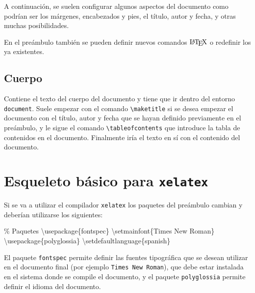 \documentclass[
  a4paper,
]{scrreport}
\newenvironment{Shaded}{\begin{snugshade}}{\end{snugshade}}
\newcommand{\BuiltInTok}[1]{\textcolor[rgb]{0.00,0.23,0.31}{#1}}
\newcommand{\CommentTok}[1]{\textcolor[rgb]{0.37,0.37,0.37}{#1}}
\newcommand{\ExtensionTok}[1]{\textcolor[rgb]{0.00,0.23,0.31}{#1}}
\newcommand{\FunctionTok}[1]{\textcolor[rgb]{0.28,0.35,0.67}{#1}}
\newcommand{\NormalTok}[1]{\textcolor[rgb]{0.00,0.23,0.31}{#1}}
\begin{document}
A continuación, se suelen configurar algunos aspectos del documento como
podrían ser los márgenes, encabezados y pies, el título, autor y fecha,
y otras muchas posibilidades.

En el preámbulo también se pueden definir nuevos comandos
\(\text{\LaTeX}\) o redefinir los ya existentes.

\hypertarget{cuerpo}{%
\subsection{Cuerpo}\label{cuerpo}}

Contiene el texto del cuerpo del documento y tiene que ir dentro del
entorno \texttt{document}. Suele empezar con el comando
\texttt{\textbackslash{}maketitle} si se desea empezar el documento con
el título, autor y fecha que se hayan definido previamente en el
preámbulo, y le sigue el comando
\texttt{\textbackslash{}tableofcontents} que introduce la tabla de
contenidos en el documento. Finalmente iría el texto en sí con el
contenido del documento.

\hypertarget{esqueleto-buxe1sico-para-xelatex}{%
\section{\texorpdfstring{Esqueleto básico para
\texttt{xelatex}}{Esqueleto básico para xelatex}}\label{esqueleto-buxe1sico-para-xelatex}}

Si se va a utilizar el compilador \texttt{xelatex} los paquetes del
preámbulo cambian y deberían utilizarse los siguientes:

\begin{Shaded}
\begin{Highlighting}[]
\CommentTok{\% Paquetes}
\BuiltInTok{\textbackslash{}usepackage}\NormalTok{\{}\ExtensionTok{fontspec}\NormalTok{\}}
\FunctionTok{\textbackslash{}setmainfont}\NormalTok{\{Times New Roman\}}
\BuiltInTok{\textbackslash{}usepackage}\NormalTok{\{}\ExtensionTok{polyglossia}\NormalTok{\}}
\FunctionTok{\textbackslash{}setdefaultlanguage}\NormalTok{\{spanish\}}
\end{Highlighting}
\end{Shaded}

El paquete \texttt{fontspec} permite definir las fuentes tipográfica que
se desean utilizar en el documento final (por ejemplo
\texttt{Times\ New\ Roman}), que debe estar instalada en el sistema
donde se compile el documento, y el paquete \texttt{polyglossia} permite
definir el idioma del documento.
\end{document}

